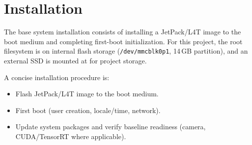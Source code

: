\section{Installation}
\noindent
The base system installation consists of installing a JetPack/L4T image to the boot medium and completing first-boot initialization.
For this project, the root filesystem is on internal flash storage (\texttt{/dev/mmcblk0p1}, 14\,GB partition), and an external SSD is mounted at  for project storage.

\vspace{1mm}
\noindent
A concise installation procedure is:
\begin{itemize}
	\item Flash JetPack/L4T image to the boot medium.
	\item First boot (user creation, locale/time, network).
	\item Update system packages and verify baseline readiness (camera, CUDA/TensorRT where applicable).
\end{itemize}

